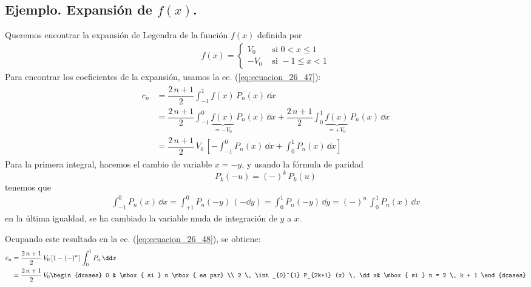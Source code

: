 \subsection{Ejemplo. Expansión de $f(x)$.}
Queremos encontrar la expansión de Legendra de la función $f(x)$ definida por
\begin{align*}
f(x) = \begin{cases}
V_{0} & \mbox{ si } 0 < x \leq 1 \\
-V_{0} & \mbox { si } -1 \leq x < 1
\end{cases}
\end{align*}
Para encontrar los coeficientes de la expansión, usamos la ec. (\ref{eq:ecuacion_26_47}):
\begin{align}
\begin{aligned}
c_{n} &= \dfrac{2 \, n + 1}{2} \int_{-1}^{1} f(x) \, P_{n} (x) \, \dd x \\
&= \dfrac{2 \, n + 1}{2} \int_{-1}^{0} \underbrace{f(x)}_{=-V_{0}} \, P_{n} (x) \, \dd x + \dfrac{2 \, n + 1}{2} \int_{0}^{1} \underbrace{f(x)}_{=+V_{0}} \, P_{n} (x) \, \dd x \\
&= \dfrac{2 \, n + 1}{2} \, V_{0} \, \left[ - \int_{-1}^{0} P_{n} (x) \, \dd x + \int_{0}^{1} P_{n} (x) \, \dd x  \right]
\end{aligned}
\label{eq:ecuacion_26_48}
\end{align}
Para la primera integral, hacemos el cambio de variable $x = -y$, y usando la fórmula de paridad
\begin{equation}
P_{k}(-u) = (-)^{k} \, P_{k}(u)
\label{eq:ecuacion_26_35}
\end{equation}
tenemos que
\begin{align*}
\int_{-1}^{0} P_{n}(x) \, \dd x = \int_{+1}^{0} P_{n} (-y) \, (- \dd y) = \int_{0}^{1} P_{n} (-y) \, \dd y = (-)^{n} \, \int_{0}^{1} P_{n} (x) \, \dd x  
\end{align*}
en la última igualdad, se ha cambiado la variable muda de integración de $y$ a $x$.
\par
Ocupando este resultado en la ec. (\ref{eq:ecuacion_26_48}), se obtiene:
\begin{align*}
c_{n} &= \dfrac{2 \, n + 1}{2} \, V_{0} \left[ 1 - (-)^{n} \right] \, \int_{0}^{1} P_{n} \, \dd x \\
&= \dfrac{2 \, n + 1}{2} \, V_{0} \begin{dcases}
0 & \mbox{ si } n \mbox{ es par} \\
2 \, \int_{0}^{1} P_{2k+1} (x) \, \dd x& \mbox{ si } n = 2 \, k + 1
\end{dcases}
\end{align*}
